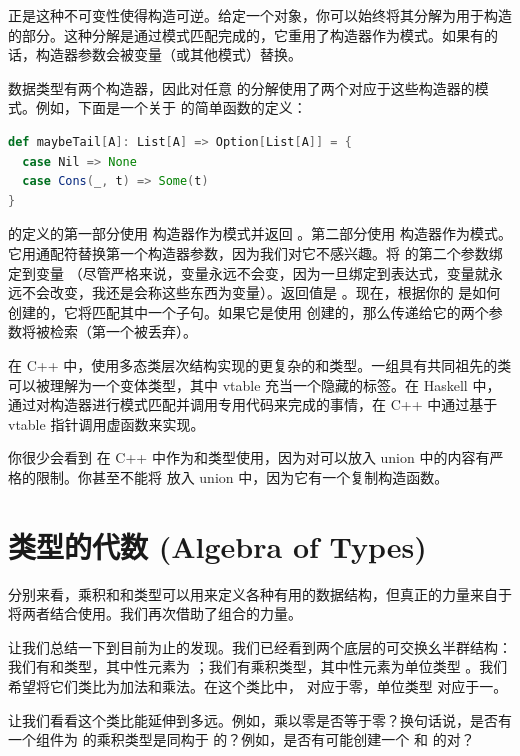正是这种不可变性使得构造可逆。给定一个对象，你可以始终将其分解为用于构造的部分。这种分解是通过模式匹配完成的，它重用了构造器作为模式。如果有的话，构造器参数会被变量（或其他模式）替换。

 数据类型有两个构造器，因此对任意  的分解使用了两个对应于这些构造器的模式。例如，下面是一个关于  的简单函数的定义：

\begin{lstlisting}[language=Scala]
def maybeTail[A]: List[A] => Option[List[A]] = {
  case Nil => None
  case Cons(_, t) => Some(t)
}
\end{lstlisting}
 的定义的第一部分使用  构造器作为模式并返回 。第二部分使用  构造器作为模式。它用通配符替换第一个构造器参数，因为我们对它不感兴趣。将  的第二个参数绑定到变量 （尽管严格来说，变量永远不会变，因为一旦绑定到表达式，变量就永远不会改变，我还是会称这些东西为变量）。返回值是 。现在，根据你的  是如何创建的，它将匹配其中一个子句。如果它是使用  创建的，那么传递给它的两个参数将被检索（第一个被丢弃）。

在 C++ 中，使用多态类层次结构实现的更复杂的和类型。一组具有共同祖先的类可以被理解为一个变体类型，其中 vtable 充当一个隐藏的标签。在 Haskell 中，通过对构造器进行模式匹配并调用专用代码来完成的事情，在 C++ 中通过基于 vtable 指针调用虚函数来实现。

你很少会看到  在 C++ 中作为和类型使用，因为对可以放入 union 中的内容有严格的限制。你甚至不能将  放入 union 中，因为它有一个复制构造函数。

\section{类型的代数 (Algebra of Types)}

分别来看，乘积和和类型可以用来定义各种有用的数据结构，但真正的力量来自于将两者结合使用。我们再次借助了组合的力量。

让我们总结一下到目前为止的发现。我们已经看到两个底层的可交换幺半群结构：我们有和类型，其中性元素为 ；我们有乘积类型，其中性元素为单位类型 \code{()}。我们希望将它们类比为加法和乘法。在这个类比中， 对应于零，单位类型 \code{()} 对应于一。

让我们看看这个类比能延伸到多远。例如，乘以零是否等于零？换句话说，是否有一个组件为  的乘积类型是同构于  的？例如，是否有可能创建一个  和  的对？

